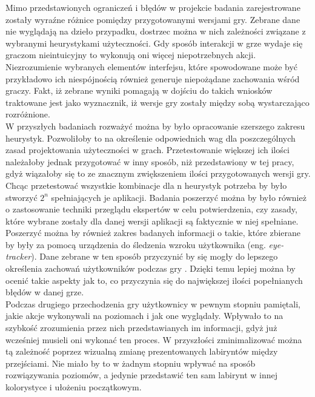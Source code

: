 \documentclass[a4paper,12pt,numbers=noenddot]{report}
\begin{document}
Mimo przedstawionych ograniczeń i błędów w projekcie badania zarejestrowane zostały wyraźne różnice pomiędzy przygotowanymi wersjami gry. Zebrane dane nie wyglądają na dzieło przypadku, dostrzec można w nich zależności związane z wybranymi heurystykami użyteczności. Gdy sposób interakcji w grze wydaje się graczom nieintuicyjny to wykonują oni więcej niepotrzebnych akcji. Niezrozumienie wybranych elementów interfejsu, które spowodowane może być przykładowo ich niespójnością również generuje niepożądane zachowania wśród graczy. Fakt, iż zebrane wyniki pomagają w dojściu do takich wniosków traktowane jest jako wyznacznik, iż wersje gry zostały między sobą wystarczająco rozróżnione. \\


W przyszłych badaniach rozważyć można by było opracowanie szerszego zakresu heurystyk. Pozwoliłoby to na określenie odpowiednich wag dla poszczególnych zasad projektowania użyteczności w grach. Przetestowanie większej ich ilości należałoby jednak przygotować w inny sposób, niż przedstawiony w tej pracy, gdyż wiązałoby się to ze znacznym zwiększeniem ilości przygotowanych wersji gry. Chcąc przetestować wszystkie kombinacje dla n heurystyk potrzeba by było stworzyć $2^{n}$ spełniających je aplikacji. Badania poszerzyć można by było również o zastosowanie techniki przeglądu ekspertów w celu potwierdzenia, czy zasady, które wybrane zostały dla danej wersji aplikacji są faktycznie w niej spełniane.\\
Poszerzyć można by również zakres badanych informacji o takie, które zbierane by były za pomocą urządzenia do śledzenia wzroku użytkownika (eng. \textit{eye-tracker}). Dane zebrane w ten sposób przyczynić by się mogły do lepszego określenia zachowań użytkowników podczas gry \cite{online_Eyetracking}. Dzięki temu lepiej można by ocenić takie aspekty jak to, co przyczynia się do największej ilości popełnianych błędów w danej grze.\\
Podczas drugiego przechodzenia gry użytkownicy w pewnym stopniu pamiętali, jakie akcje wykonywali na poziomach i jak one wyglądały. Wpływało to na szybkość zrozumienia przez nich przedstawianych im informacji, gdyż już wcześniej musieli oni wykonać ten proces. W przyszłości zminimalizować można tą zależność poprzez wizualną zmianę prezentowanych labiryntów między przejściami. Nie miało by to w żadnym stopniu wpływać na sposób rozwiązywania poziomów, a jedynie przedstawić ten sam labirynt w innej kolorystyce i ułożeniu początkowym.\\
\end{document}

